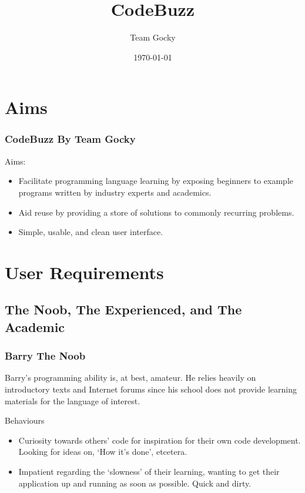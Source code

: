 \documentclass[handout, t]{beamer}
\title[DIM3 Project Presentation]{CodeBuzz}
\author{Team Gocky}
\institute{University Of Glasgow}
\date{\today}
\begin{document}
\section{Aims}

\begin{frame}
\frametitle{CodeBuzz By Team Gocky}
Aims:
\begin{itemize}
\item Facilitate programming language learning by exposing beginners to
example programs written by industry experts and academics.
\item Aid reuse by providing a store of solutions to commonly recurring
problems.
\item Simple, usable, and clean user interface.
\end{itemize}
\end{frame}

\section{User Requirements}

\subsection{The Noob, The Experienced, and The Academic}

\begin{frame}
\frametitle{Barry The Noob}
Barry's programming ability is, at best,
amateur. He relies heavily on introductory texts and Internet forums
since his school does not provide learning materials for the language
of interest.
\item Behaviours
    \begin{itemize}
    \item Curiosity towards others' code for inspiration for their own code
    development. Looking for ideas on, `How it's done', etcetera.
    \item Impatient regarding the `slowness' of their learning, wanting to
    get their application up and running as soon as possible. Quick and
    dirty.
    \end{itemize}
\end{frame}
\end{document}
